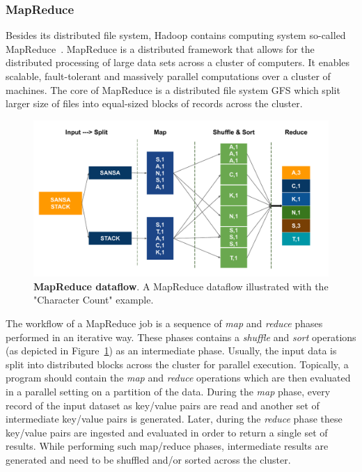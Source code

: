 \subsubsection{MapReduce}
Besides its distributed file system, Hadoop contains computing system so-called MapReduce~\cite{dg2004mapreduce}.
MapReduce is a distributed framework that allows for the distributed processing of large data sets across a cluster of computers.
It enables scalable, fault-tolerant and massively parallel computations over a cluster of machines.
The core of MapReduce is a distributed file system \gls{GFS} which split larger size of files into equal-sized blocks of records across the cluster.

\begin{figure}
\centering
\includegraphics[width=1.0\columnwidth]{images/2_preliminaries/mapreduce-dataflow.pdf}
 \caption{\textbf{MapReduce dataflow}. A MapReduce dataflow illustrated with the "Character Count" example.}
\label{fig:preliminaries-mapreduce-dataflow}
\end{figure}

The workflow of a MapReduce job is a sequence of \textit{map} and \textit{reduce} phases performed in an iterative way.
These phases contains a \textit{shuffle} and \textit{sort} operations (as depicted in Figure~\ref{fig:preliminaries-mapreduce-dataflow}) as an intermediate phase.
Usually, the input data is split into distributed blocks across the cluster for parallel execution.
Topically, a program should contain the \textit{map} and \textit{reduce} operations which are then evaluated in a parallel setting on a partition of the data.
During the \textit{map} phase, every record of the input dataset as key/value pairs are read and another set of intermediate key/value pairs is generated.
Later, during the \textit{reduce} phase these key/value pairs are ingested and evaluated in order to return a single set of results.
While performing such map/reduce phases, intermediate results are generated and need to be shuffled and/or sorted across the cluster.


